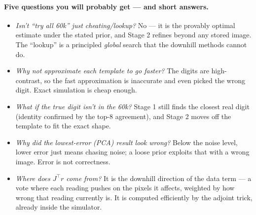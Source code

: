 \documentclass[11pt]{article}
\begin{document}
\paragraph{Five questions you will probably get --- and short answers.}
\begin{itemize}[leftmargin=2em]
\item \emph{Isn't ``try all 60k'' just cheating/lookup?} No --- it is the
provably optimal estimate under the stated prior, and Stage 2 refines beyond
any stored image. The ``lookup'' is a principled \emph{global} search that the
downhill methods cannot do.
\item \emph{Why not approximate each template to go faster?} The digits are
high-contrast, so the fast approximation is inaccurate and even picked the
wrong digit. Exact simulation is cheap enough.
\item \emph{What if the true digit isn't in the 60k?} Stage 1 still finds the
closest real digit (identity confirmed by the top-8 agreement), and Stage 2
moves off the template to fit the exact shape.
\item \emph{Why did the lowest-error (PCA) result look wrong?} Below the noise
level, lower error just means chasing noise; a loose prior exploits that with
a wrong image. Error is not correctness.
\item \emph{Where does $J^\top r$ come from?} It is the downhill direction of
the data term --- a vote where each reading pushes on the pixels it affects,
weighted by how wrong that reading currently is. It is computed efficiently by
the adjoint trick, already inside the simulator.
\end{itemize}
\end{document}
